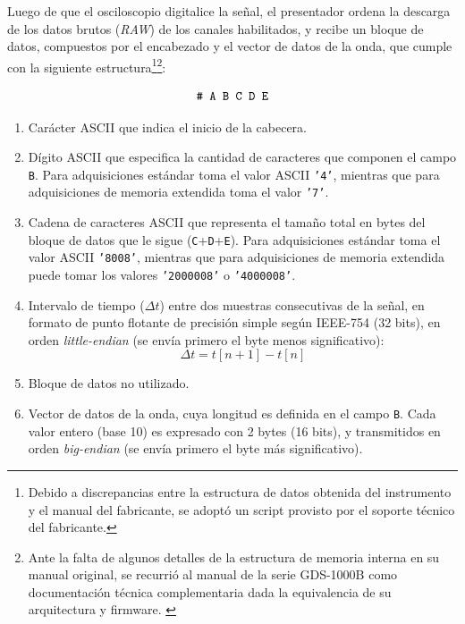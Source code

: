 Luego de que el osciloscopio digitalice la señal, el presentador ordena la descarga de los datos brutos (\emph{RAW}) de los canales habilitados, y recibe un bloque de datos, compuestos por el encabezado y el vector de datos de la onda, que cumple con la siguiente estructura\footnote{Debido a discrepancias entre la estructura de datos obtenida del instrumento y el manual del fabricante, se adoptó un script provisto por el soporte técnico del fabricante.}\footnote{Ante la falta de algunos detalles de la estructura de memoria interna en su manual original, se recurrió al manual de la serie GDS-1000B como documentación técnica complementaria dada la equivalencia de su arquitectura y firmware. \cite{gds1000b_ProgrammingManual}}:

\begin{equation*}\label{eq:formato_memoria}
    \text{\texttt{\# A B C D E}}
\end{equation*}
\begin{enumerate}
    \item[\texttt{\#:}] [\num{1} byte] Carácter ASCII que indica el inicio de la cabecera.
    \item[\texttt{A:}] [\num{1} byte] Dígito ASCII que especifica la cantidad de caracteres que componen el campo \texttt{B}. Para adquisiciones estándar toma el valor ASCII \texttt{'4'}, mientras que para adquisiciones de memoria extendida toma el valor \texttt{'7'}.
    \item[\texttt{B:}] [\num{4} o \num{7} bytes] Cadena de caracteres ASCII que representa el tamaño total en bytes del bloque de datos que le sigue (\texttt{C}+\texttt{D}+\texttt{E}).
    Para adquisiciones estándar toma el valor ASCII \texttt{'8008'}, mientras que para adquisiciones de memoria extendida puede tomar los valores \texttt{'2000008'} o \texttt{'4000008'}.
    \item[\texttt{C:}] [\num{4} bytes] Intervalo de tiempo ($\Delta t$) entre dos muestras consecutivas de la señal, en formato de punto flotante de precisión simple según IEEE-754 (\num{32} bits), en orden \emph{little-endian} (se envía primero el byte menos significativo):
    \begin{equation*}\label{eq:periodo_muestreo}
    \Delta t = t[n+1] - t[n]
    \end{equation*}
    \item[\texttt{D:}] [\num{4} bytes] Bloque de datos no utilizado.
    \item[\texttt{E:}] [\num{8e3}, \num{2e6} o \num{4e6} bytes] Vector de datos de la onda, cuya longitud es definida en el campo \texttt{B}. Cada valor entero (base \num{10}) es expresado con \num{2} bytes (\num{16} bits), y transmitidos en orden \emph{big-endian} (se envía primero el byte más significativo).
\end{enumerate}

